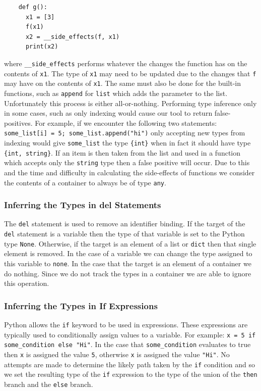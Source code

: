 \documentclass[12pt, titlepage]{article}
\begin{document}
\begin{lstlisting}
    def g():
      x1 = [3]
      f(x1)
      x2 = __side_effects(f, x1)
      print(x2)
\end{lstlisting}
where \texttt{\_\_side\_effects} performs whatever the changes the function has on the contents of \texttt{x1}. The type of \texttt{x1} may need to be updated due to the changes that \texttt{f} may have on the contents of \texttt{x1}. The same must also be done for the built-in functions, such as \texttt{append} for \texttt{list} which adds the parameter to the list. \\
\indent Unfortunately this process is either all-or-nothing. Performing type inference only in some cases, such as only indexing would cause our tool to return false-positives. For example, if we encounter the following two statements: \texttt{some\_list[i] = 5; some\_list.append("hi")} only accepting new types from indexing would give \texttt{some\_list} the type \texttt{\{int\}} when in fact it should have type \texttt{\{int, string\}}. If an item is then taken from the list and used in a function which accepts only the \texttt{string} type then a false positive will occur. Due to this and the time and difficulty in calculating the side-effects of functions we consider the contents of a container to always be of type \texttt{any}.

\subsubsection{Inferring the Types in del Statements}
\label{chap:del}
The \texttt{del} statement is used to remove an identifier binding. If the target of the \texttt{del}  statement is a variable then the type of that variable is set to the Python type \texttt{None}. Otherwise, if the target is an element of a list or \texttt{dict} then that single element is removed. In the case of a variable we can change the type assigned to this variable to \texttt{none}. In the case that the target is an element of a container we do nothing. Since we do not track the types in a container we are able to ignore this operation.

\subsubsection{Inferring the Types in If Expressions}
Python allows the \texttt{if} keyword to be used in expressions. These expressions are typically used to conditionally assign values to a variable. For example: \texttt{x = 5 if some\_condition else "Hi"}. In the case that \texttt{some\_condition} evaluates to true then \texttt{x} is assigned the value \texttt{5}, otherwise \texttt{x} is assigned the value \texttt{"Hi"}. No attempts are made to determine the likely path taken by the \texttt{if} condition and so we set the resulting type of the \texttt{if} expression to the type of the union of the \texttt{then} branch and the \texttt{else} branch.
\end{document}
